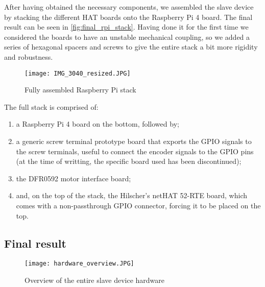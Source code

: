After having obtained the necessary components, we assembled the slave device by stacking the different HAT boards onto the Raspberry Pi 4 board.
The final result can be seen in \autoref{fig:final_rpi_stack}.
Having done it for the first time we considered the boards to have an unstable mechanical coupling, so we added a series of hexagonal spacers and screws to give the entire stack a bit more rigidity and robustness.

\begin{figure}[htp]
	\centering
	\texttt{[image: IMG\_3040\_resized.JPG]}
	\caption{Fully assembled Raspberry Pi stack}
	\label{fig:final_rpi_stack}
\end{figure}

The full stack is comprised of:
\begin{enumerate}
	\item a Raspberry Pi 4 board \cite{product:rpi4} on the bottom, followed by;
	\item a generic screw terminal prototype board that exports the GPIO signals to the screw terminals, useful to connect the encoder signals to the GPIO pins (at the time of writting, the specific board used has been discontinued);
	\item the DFR0592 motor interface board;
	\item and, on the top of the stack, the Hilscher's netHAT 52-RTE board, which comes with a non-passthrough GPIO connector, forcing it to be placed on the top.
\end{enumerate}

\subsection*{Final result}

\begin{figure}[htp]
	\centering
	\texttt{[image: hardware\_overview.JPG]}
	\caption{Overview of the entire slave device hardware}
	\label{fig:hardware_overview}
\end{figure}
